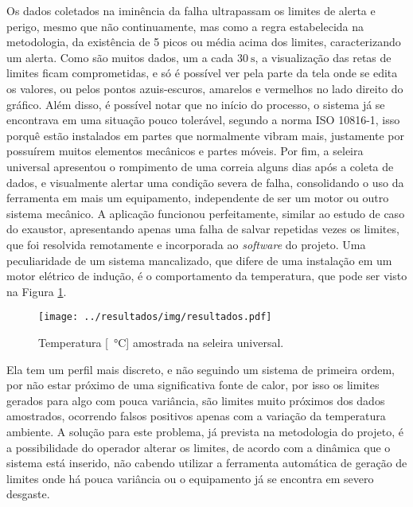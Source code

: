 \documentclass[a4paper]{ifacconf}
\begin{document}
Os dados coletados na iminência da falha ultrapassam os limites de alerta e perigo, mesmo que não continuamente, mas
como a regra estabelecida na metodologia, da existência de 5 picos ou média acima dos limites, caracterizando um alerta. Como são muitos dados,
um a cada $\SI{30}{\second}$, a visualização das retas de limites ficam comprometidas, e só é possível ver pela parte da tela onde se edita os
valores, ou pelos pontos azuis-escuros, amarelos e vermelhos no lado direito do gráfico. Além disso, é possível notar que no início do processo,
o sistema já se encontrava em uma situação pouco tolerável, segundo a norma ISO 10816-1, isso porquê estão instalados em partes que 
normalmente vibram mais, justamente por possuírem muitos elementos mecânicos e partes móveis. Por fim, a seleira universal apresentou o rompimento de uma
correia alguns dias após a coleta de dados, e visualmente alertar uma condição severa de falha, consolidando o uso da ferramenta em
mais um equipamento, independente de ser um motor ou outro sistema mecânico. A aplicação funcionou perfeitamente, similar ao estudo de caso do
exaustor, apresentando apenas uma falha de salvar repetidas vezes os limites, que foi resolvida remotamente e incorporada ao \textit{software} do projeto.
Uma peculiaridade de um sistema mancalizado, que difere de uma instalação em um motor elétrico de indução, é o comportamento da temperatura,
que pode ser visto na Figura \ref{fig:seleira_universal_temperatura}. 

\begin{figure}[h!]
  \begin{center}
      \texttt{[image: ../resultados/img/resultados.pdf]}
  \end{center}
  \caption{Temperatura [\SI{}{\celsius}] amostrada na seleira universal.}
  \label{fig:seleira_universal_temperatura}
\end{figure}

Ela tem um perfil mais discreto, e não seguindo um sistema de primeira ordem, por não estar próximo de uma significativa fonte de calor, por isso
os limites gerados para algo com pouca variância, são limites muito próximos dos dados amostrados, ocorrendo falsos positivos apenas com a
variação da temperatura ambiente. A solução para este problema, já prevista na metodologia do projeto, é a possibilidade do operador alterar os limites, de 
acordo com a dinâmica que o sistema está inserido, não cabendo utilizar a ferramenta automática de geração de limites onde há pouca variância 
ou o equipamento já se encontra em severo desgaste.
\end{document}
